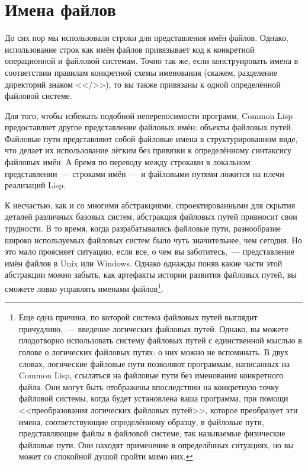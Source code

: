 \section{Имена файлов}

До сих пор мы использовали строки для представления имён файлов. Однако, использование
строк как имён файлов привязывает код к конкретной операционной и файловой системам. Точно
так же, если конструировать имена в соответствии правилам конкретной схемы именования
(скажем, разделение директорий знаком <</>>), то вы также привязаны к одной определённой
файловой системе.

Для того, чтобы избежать подобной непереносимости программ, Common Lisp предоставляет
другое представление файловых имён: объекты файловых путей. Файловые пути представляют
собой файловые имена в структурированном виде, что делает их использование лёгким без
привязки к определённому синтаксису файловых имён. А бремя по переводу между строками в
локальном представлении~--- строками имён~--- и файловыми путями ложится на плечи реализаций
Lisp.

К несчастью, как и со многими абстракциями, спроектированными для скрытия деталей
различных базовых систем, абстракция файловых путей привносит свои трудности. В то время,
когда разрабатывались файловые пути, разнообразие широко используемых файловых систем было
чуть значительнее, чем сегодня. Но это мало проясняет ситуацию, если все, о чем вы
заботитесь,~--- представление имён файлов в Unix или Windows. Однако однажды поняв какие
части этой абстракции можно забыть, как артефакты истории развития файловых путей, вы
сможете ловко управлять именами файлов\footnote{Еще одна причина, по которой система
  файловых путей выглядит причудливо,~--- введение логических файловых путей. Однако, вы
  можете плодотворно использовать систему файловых путей с единственной мыслью в голове о
  логических файловых путях: о них можно не вспоминать. В двух словах, логические файловые
  пути позволяют программам, написанных на Common Lisp, ссылаться на файловые пути без
  именования конкретного файла. Они могут быть отображены впоследствии на конкретную точку
  файловой системы, когда будет установлена ваша программа, при помощи <<преобразования
  логических файловых путей>>, которое преобразует эти имена, соответствующие определённому
  образцу, в файловые пути, представляющие файлы в файловой системе, так называемые
  физические файловые пути. Они находят применение в определённых ситуациях, но вы может
  со спокойной душой пройти мимо них.}.


